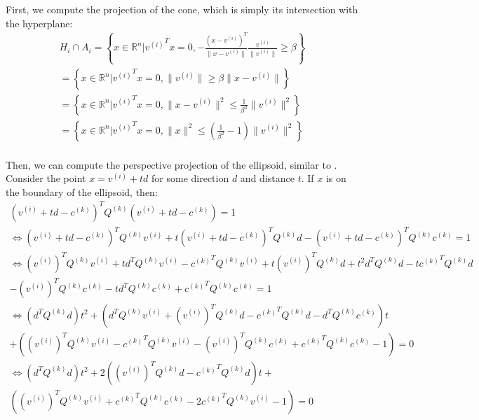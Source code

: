 \documentclass{article}
\theoremstyle{case}
\numberwithin{theorem}{subsection}
\newcommand{\ck}{{c^{(k)}}}
\newcommand{\qk}{{Q^{(k)}}}
\newcommand{\Rn}{\mathbb R^n}
\begin{document}
First, we compute the projection of the cone, which is simply its intersection with the hyperplane:
\begin{align*}
H_i \cap A_i 
= \left\{x \in \Rn \bigg| {v^{(i)}}^Tx = 0, -\frac{\left(x - v^{(i)}\right)^T}{\|x - v^{(i)}\|}\frac{v^{(i)}}{\|v^{(i)}\|}\ge \beta \right\} \\
= \left\{x \in \Rn \bigg| {v^{(i)}}^Tx = 0, \|v^{(i)}\|\ge \beta\|x - v^{(i)}\| \right\} \\
= \left\{x \in \Rn \bigg| {v^{(i)}}^Tx = 0, \|x - v^{(i)}\|^2 \le \frac 1 {\beta^2}\|v^{(i)}\|^2 \right\} \\
= \left\{x \in \Rn \bigg| {v^{(i)}}^Tx = 0, \|x\|^2 \le \left(\frac 1 {\beta^2} - 1\right)\|v^{(i)}\|^2 \right\} \\
\end{align*}

Then, we can compute the perspective projection of the ellipsoid, similar to \cite{eberly_2013}.
Consider the point $x = v^{(i)} + td$ for some direction $d$ and distance $t$.
If $x$ is on the boundary of the ellipsoid, then:
\begin{align*}
(v^{(i)} + t d - \ck )^T \qk  (v^{(i)} + t d - \ck ) = 1 \\
\Longleftrightarrow (v^{(i)} + t d - \ck )^T \qk  v^{(i)} + t (v^{(i)} + t d - \ck )^T \qk  d - (v^{(i)} + t d - \ck )^T \qk  \ck  = 1 \\
\Longleftrightarrow \left(v^{(i)}\right)^T \qk  v^{(i)} + t d^T \qk  v^{(i)} - \ck ^T \qk  v^{(i)} + t \left(v^{(i)}\right)^T \qk  d + t^2 d^T \qk  d - t \ck ^T \qk  d \\- \left(v^{(i)}\right)^T \qk  \ck  - t d^T \qk  \ck + \ck ^T \qk  \ck  = 1 \\
\Longleftrightarrow \left(d^T\qk d
\right) t^2 + \left(
d^T \qk  v^{(i)} +  \left(v^{(i)}\right)^T \qk  d - \ck ^T \qk  d - d^T \qk  \ck 
\right) t \\ +  \left(
\left(v^{(i)}\right)^T \qk  v^{(i)} - \ck ^T \qk  v^{(i)} - \left(v^{(i)}\right)^T \qk  \ck   + \ck ^T \qk  \ck  - 1
\right) = 0 \\
\Longleftrightarrow \left(d^T\qk d
\right) t^2 + 2\left(
\left(v^{(i)}\right)^T \qk  d - \ck ^T\qk d
\right) t + \\ \left(
\left(v^{(i)}\right)^T \qk  v^{(i)} + \ck ^T \qk  \ck  - 2 \ck ^T \qk  v^{(i)} - 1
\right) = 0
\end{align*}
\end{document}
